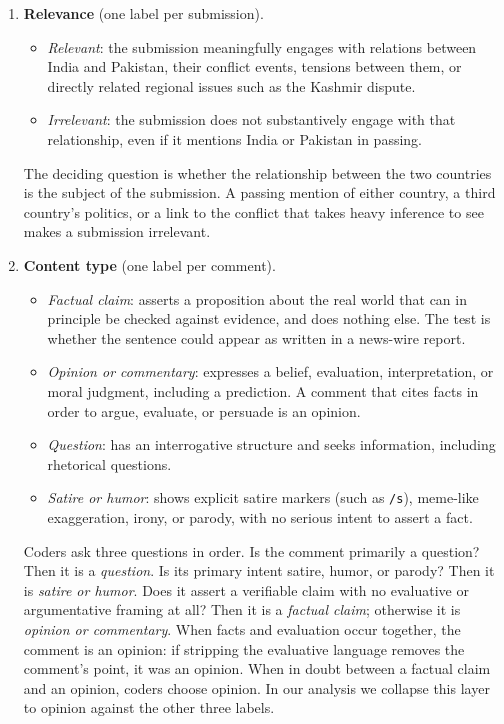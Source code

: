 \begin{enumerate}
\item \textbf{Relevance} (one label per submission).
\begin{itemize}
\item \textit{Relevant}: the submission meaningfully engages with relations between
India and Pakistan, their conflict events, tensions between them, or directly
related regional issues such as the Kashmir dispute.
\item \textit{Irrelevant}: the submission does not substantively engage with that
relationship, even if it mentions India or Pakistan in passing.
\end{itemize}
The deciding question is whether the relationship between the two countries is
the subject of the submission. A passing mention of either country, a third
country's politics, or a link to the conflict that takes heavy inference to see
makes a submission irrelevant.

\item \textbf{Content type} (one label per comment).
\begin{itemize}
\item \textit{Factual claim}: asserts a proposition about the real world that can
in principle be checked against evidence, and does nothing else. The test is
whether the sentence could appear as written in a news-wire report.
\item \textit{Opinion or commentary}: expresses a belief, evaluation,
interpretation, or moral judgment, including a prediction. A comment that cites
facts in order to argue, evaluate, or persuade is an opinion.
\item \textit{Question}: has an interrogative structure and seeks information,
including rhetorical questions.
\item \textit{Satire or humor}: shows explicit satire markers (such as
\texttt{/s}), meme-like exaggeration, irony, or parody, with no serious intent to
assert a fact.
\end{itemize}
Coders ask three questions in order. Is the comment primarily a question? Then it
is a \textit{question}. Is its primary intent satire, humor, or parody? Then it is
\textit{satire or humor}. Does it assert a verifiable claim with no evaluative or
argumentative framing at all? Then it is a \textit{factual claim}; otherwise it is
\textit{opinion or commentary}. When facts and evaluation occur together, the
comment is an opinion: if stripping the evaluative language removes the
comment's point, it was an opinion. When in doubt between a factual claim and an
opinion, coders choose opinion. In our analysis we collapse this layer to opinion
against the other three labels.


\end{enumerate}
